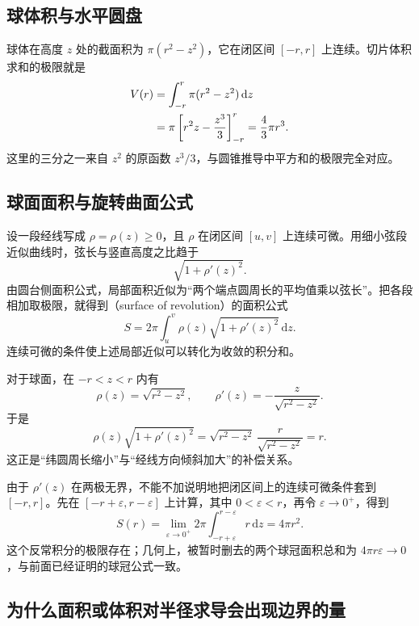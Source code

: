 \documentclass[UTF8]{ctexart}
\begin{document}
\subsection{球体积与水平圆盘}

球体在高度 $z$ 处的截面积为 $\pi(r^2-z^2)$，它在闭区间 $[-r,r]$ 上连续。切片体积求和的极限就是
\begin{align}
  V(r)
  &=\int_{-r}^{r}\pi(r^2-z^2)\,\mathrm{d}z\notag\\
  &=\pi\left[r^2z-\frac{z^3}{3}\right]_{-r}^{r}
   =\frac43\pi r^3.
  \label{eq:cs-volume-integral}
\end{align}
这里的三分之一来自 $z^2$ 的原函数 $z^3/3$，与圆锥推导中平方和的极限完全对应。

\subsection{球面面积与旋转曲面公式}

设一段经线写成 $\rho=\rho(z)\geq0$，且 $\rho$ 在闭区间 $[u,v]$ 上连续可微。用细小弦段近似曲线时，弦长与竖直高度之比趋于
\[
  \sqrt{1+\rho'(z)^2}.
\]
由圆台侧面积公式，局部面积近似为“两个端点圆周长的平均值乘以弦长”。把各段相加取极限，就得到（surface of revolution）的面积公式
\begin{equation}\label{eq:cs-revolution-area}
  S=2\pi\int_u^v\rho(z)\sqrt{1+\rho'(z)^2}\,\mathrm{d}z.
\end{equation}
连续可微的条件使上述局部近似可以转化为收敛的积分和。

对于球面，在 $-r<z<r$ 内有
\[
  \rho(z)=\sqrt{r^2-z^2},\qquad
  \rho'(z)=-\frac{z}{\sqrt{r^2-z^2}}.
\]
于是
\begin{equation}\label{eq:cs-area-compensation}
  \rho(z)\sqrt{1+\rho'(z)^2}
  =\sqrt{r^2-z^2}\,\frac{r}{\sqrt{r^2-z^2}}
  =r.
\end{equation}
这正是“纬圆周长缩小”与“经线方向倾斜加大”的补偿关系。

由于 $\rho'(z)$ 在两极无界，不能不加说明地把闭区间上的连续可微条件套到 $[-r,r]$。先在 $[-r+\varepsilon,r-\varepsilon]$ 上计算，其中 $0<\varepsilon<r$，再令 $\varepsilon\to0^+$，得到
\begin{equation}\label{eq:cs-surface-integral}
  S(r)=\lim_{\varepsilon\to0^+}
  2\pi\int_{-r+\varepsilon}^{r-\varepsilon}r\,\mathrm{d}z
  =4\pi r^2.
\end{equation}
这个反常积分的极限存在；几何上，被暂时删去的两个球冠面积总和为 $4\pi r\varepsilon\to0$，与前面已经证明的球冠公式一致。

\subsection{为什么面积或体积对半径求导会出现边界的量}
\end{document}
